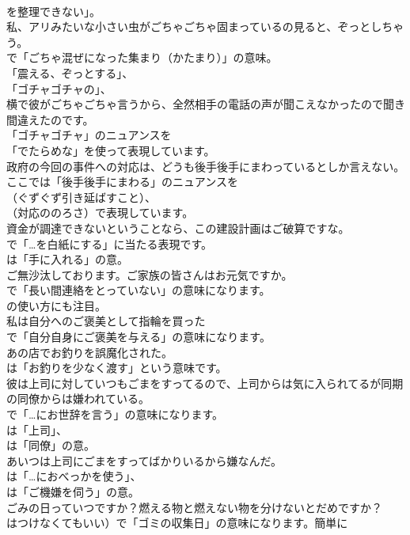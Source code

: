 \documentclass[8pt]{extreport}
\begin{document}
\begin{CJK}{UTF8}{min}
\\	を整理できない」。	
\\	私、アリみたいな小さい虫がごちゃごちゃ固まっているの見ると、ぞっとしちゃう。 
\\	で「ごちゃ混ぜになった集まり（かたまり）」の意味。
\\	「震える、ぞっとする」、
\\	「ゴチャゴチャの」、	
\\	横で彼がごちゃごちゃ言うから、全然相手の電話の声が聞こえなかったので聞き間違えたのです。 
\\	「ゴチャゴチャ」のニュアンスを
\\	「でたらめな」を使って表現しています。	
\\	政府の今回の事件への対応は、どうも後手後手にまわっているとしか言えない。 
\\	ここでは「後手後手にまわる」のニュアンスを 
\\	（ぐずぐず引き延ばすこと）、
\\	（対応ののろさ）で表現しています。	
\\	資金が調達できないということなら、この建設計画はご破算ですな。 
\\	で「…を白紙にする」に当たる表現です。
\\	は「手に入れる」の意。	
\\	ご無沙汰しております。ご家族の皆さんはお元気ですか。 
\\	で「長い間連絡をとっていない」の意味になります。
\\	の使い方にも注目。	
\\	私は自分へのご褒美として指輪を買った 
\\	で「自分自身にご褒美を与える」の意味になります。	
\\	あの店でお釣りを誤魔化された。 
\\	は「お釣りを少なく渡す」という意味です。	
\\	彼は上司に対していつもごまをすってるので、上司からは気に入られてるが同期の同僚からは嫌われている。 
\\	で「…にお世辞を言う」の意味になります。
\\	は「上司」、
\\	は「同僚」の意。	
\\	あいつは上司にごまをすってばかりいるから嫌なんだ。 
\\	は「…におべっかを使う」、
\\	は「ご機嫌を伺う」の意。	
\\	ごみの日っていつですか？燃える物と燃えない物を分けないとだめですか？ 
\\	はつけなくてもいい）で「ゴミの収集日」の意味になります。簡単に

\end{CJK}
\end{document}
